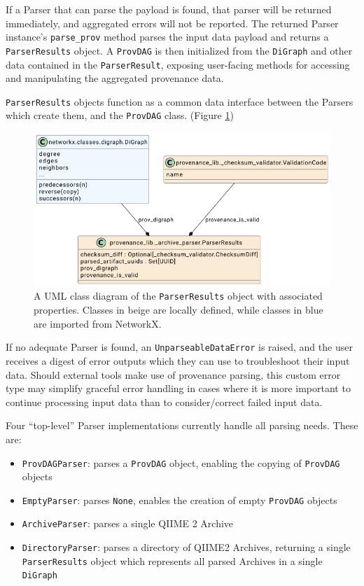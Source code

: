 If a Parser that can parse the payload is found, that parser will be returned
immediately, and aggregated errors will not be reported. The returned Parser
instance’s \texttt{parse\_prov} method parses the input data payload and returns a
\texttt{ParserResults} object. A \texttt{ProvDAG} is then initialized from the \texttt{DiGraph} and other
data contained in the \texttt{ParserResult}, exposing user-facing methods for accessing
and manipulating the aggregated provenance data.

\texttt{ParserResults} objects function as a common data interface between the Parsers
which create them, and the \texttt{ProvDAG} class. (Figure \ref{fig:ParserResultsUML})

\begin{figure}[htp]
\centering
\includegraphics[width=\textwidth]{figures/ParserResultsUML.png}
\caption[UML Class diagram of the ParserResults class and its components]%
{A UML class diagram of the \texttt{ParserResults} object with associated properties.
Classes in beige are locally defined, while classes in blue are imported from
NetworkX.}
\label{fig:ParserResultsUML}
\end{figure}

If no adequate Parser is found, an \texttt{UnparseableDataError} is raised, and the user
receives a digest of error outputs which they can use to troubleshoot their
input data. Should external tools make use of provenance parsing, this custom
error type may simplify graceful error handling in cases where it is more
important to continue processing input data than to consider/correct failed
input data. 

Four “top-level” Parser implementations currently handle all parsing needs.
These are:
\begin{itemize}
    \item \texttt{ProvDAGParser}: parses a \texttt{ProvDAG} object, enabling the copying of \texttt{ProvDAG} objects
    \item \texttt{EmptyParser}: parses \texttt{None}, enables the creation of empty \texttt{ProvDAG} objects
    \item \texttt{ArchiveParser}: parses a single QIIME 2 Archive
    \item \texttt{DirectoryParser}: parses a directory of QIIME2 Archives, returning a single \texttt{ParserResults} object which represents all parsed Archives in a single \texttt{DiGraph}
\end{itemize}

